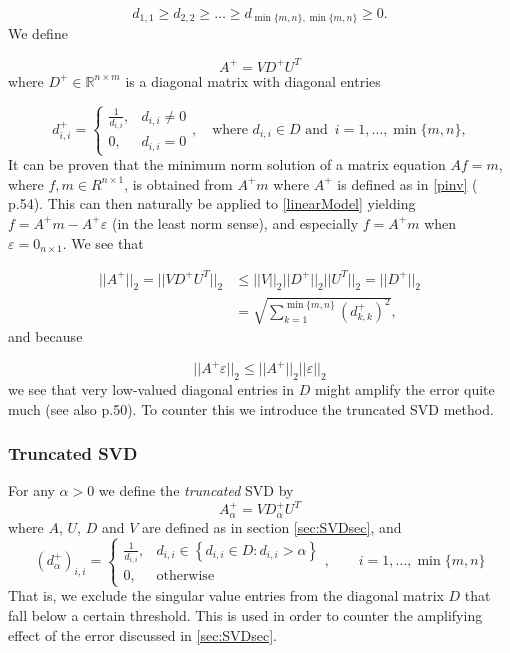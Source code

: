 \documentclass[12pt,a4]{article}
\newcommand{\R}{{\mathbb R}}
\begin{document}
\begin{equation*}
d_{1,1} \geq d_{2,2} \geq \ldots \geq d_{\min\{m,n\},\min\{m,n\}} \geq 0.
\end{equation*} 
We define 

\begin{equation}\label{pinv}
A^+ = VD^+U^T
\end{equation}
where $D^+ \in \R^{n \times m}$ is a diagonal matrix with diagonal entries 

\begin{equation*}
d^+_{i,i} = 
\begin{cases}
    \frac{1}{d_{i,i}}, & d_{i,i} \neq 0 \\
    0, & d_{i,i} = 0
\end{cases}
,\quad \text{where } d_{i,i} \in D \text{ and } \,i = 1, \ldots ,\min\{m,n\},
\end{equation*}
It can be proven that the minimum norm solution of a matrix equation $Af = m$, where $f,m \in R^{n \times 1}$, is obtained from $A^+m$ where $A^+$ is defined as in \eqref{pinv} (\cite{samu} p.54). This can then naturally be applied to \eqref{linearModel} yielding $f = A^+m - A^+\varepsilon$ (in the least norm sense), and especially 
$f = A^+m$ when $\varepsilon = 0_{n \times 1}$. We see that 

\begin{align*}
||A^+||_2 = ||VD^+U^T||_2 &\leq  ||V||_2||D^+||_2||U^T||_2 = ||D^+||_2\\
&=\sqrt{\sum_{k=1}^{\min\{m,n\}}\left( d^+_{k,k} \right)^2},
\end{align*}
and because

\begin{equation*}
||A^+ \varepsilon||_2 \leq ||A^+||_2||\varepsilon||_2
\end{equation*}
we see that very low-valued diagonal entries in $D$ might amplify the error quite much (see also \cite{samu} p.50). To counter this we introduce the truncated SVD method.

\subsubsection{Truncated SVD}\label{sec:truncSVD}
For any $\alpha > 0$ we define the \emph{truncated} SVD by 
\begin{equation}\label{truncSVD}
A^+_\alpha = V D^+_\alpha U^T
\end{equation}
where $A$, $U$, $D$ and $V$ are defined as in section \ref{sec:SVDsec}, and 
\begin{equation*}
(d^+_\alpha)_{i,i} = 
\begin{cases}
    \frac{1}{d_{i,i}}, & 
    d_{i,i} \in \left\{d_{i,i} \in D:d_{i,i} > \alpha \right\} \\
    0, & \text{otherwise}
\end{cases}
,\quad\quad i = 1, \ldots, \min\{m,n\}
\end{equation*}
That is, we exclude the singular value entries from the diagonal matrix $D$ that fall below a certain threshold. This is used in order to counter the amplifying effect of the error discussed in \ref{sec:SVDsec}.
\end{document}
